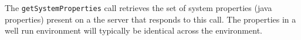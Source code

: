 The \verb+getSystemProperties+ call retrieves the set of system properties (java properties)
present on a the \Rapture server that responds to this call. The properties in a well run environment
will typically be identical across the environment.
